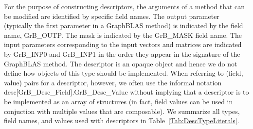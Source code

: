 For the purpose of constructing descriptors, the arguments of a method
that can be modified are identified by specific field names. The output
parameter (typically the first parameter in a GraphBLAS method) is
indicated by the field name, {\sf GrB\_OUTP}.  The mask is indicated
by the {\sf GrB\_MASK} field name. The input parameters corresponding
to the input vectors and matrices are indicated by {\sf GrB\_INP0}
and {\sf GrB\_INP1} in the order they appear in the signature of the
GraphBLAS method.  The descriptor is an opaque object and hence we do not
define how objects of this type should be implemented.   When referring to
(field, value) pairs for a descriptor, however, we often use the informal
notation {\sf desc[GrB\_Desc\_Field].GrB\_Desc\_Value} without implying
that a descriptor is to be implemented as an array of structures (in fact,
field values can be used in conjuction with multiple values that are composable).
We summarize all types, field names, and values used with descriptors
in Table~\ref{Tab:DescTypeLiterals}.

